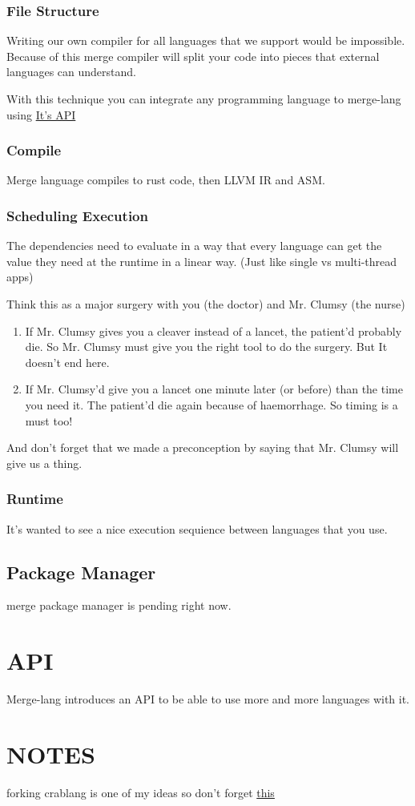 \documentclass[9pt,twocolumn]{article}
\begin{document}
\subsubsection{File Structure}
\label{sec:org44e1db5}
Writing our own compiler for all languages that we support would be impossible. Because of this merge compiler will split your code into pieces that external languages can understand.

With this technique you can integrate any programming language to merge-lang using \hyperref[sec:orgb1a1dbd]{It's API}
\subsubsection{Compile}
\label{sec:orgac8549e}
Merge language compiles to rust code, then LLVM IR and ASM.
\subsubsection{Scheduling Execution}
\label{sec:org609feaa}

The dependencies need to evaluate in a way that every language can get the value they need at the runtime in a linear way. (Just like single vs multi-thread apps)

Think this as a major surgery with you (the doctor) and Mr. Clumsy (the nurse)

\begin{enumerate}
\item If Mr. Clumsy gives you a cleaver instead of a lancet, the patient'd probably die. So Mr. Clumsy must give you the right tool to do the surgery. But It doesn't end here.
\item If Mr. Clumsy'd give you a lancet one minute later (or before) than the time you need it. The patient'd die again because of haemorrhage. So timing is a must too!
\end{enumerate}

And don't forget that we made a preconception by saying that Mr. Clumsy will give us a thing.
\subsubsection{Runtime}
\label{sec:org486ef07}
It's wanted to see a nice execution sequience between languages that you use.
\subsection{Package Manager}
\label{sec:orgeb787ab}
merge package manager is pending right now.
\section{API}
\label{sec:orgb1a1dbd}
Merge-lang introduces an API to be able to use more and more languages with it.
\section{NOTES}
\label{sec:org8ce161b}
forking crablang is one of my ideas so don't forget \href{https://internals.rust-lang.org/t/forking-rust/7874/2}{this}
\end{document}
